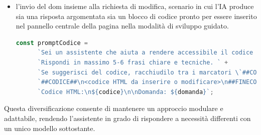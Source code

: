\begin{itemize}
    
    \item l’invio del \acrshort{dom} insieme alla richiesta di modifica, scenario in cui l’IA produce sia una risposta argomentata sia un blocco di codice pronto per essere inserito nel pannello centrale della pagina nella modalità di sviluppo guidato.
    \begin{lstlisting}[language=JavaScript, caption={Prompt per la generazione di risposta e codice \acrshort{html} accessibile}]
    const promptCodice =
      `Sei un assistente che aiuta a rendere accessibile il codice HTML. ` +
      `Rispondi in massimo 5-6 frasi chiare e tecniche. ` +
      `Se suggerisci del codice, racchiudilo tra i marcatori \`##CODICE##\` come mostrato di seguito:\n\n` +
      `##CODICE##\n<codice HTML da inserire o modificare>\n##FINECODICE##\n\n` +
      `Codice HTML:\n${codice}\n\nDomanda: ${domanda}`;
    \end{lstlisting}

\end{itemize}
Questa diversificazione consente di mantenere un approccio modulare e adattabile, rendendo l’assistente in grado di rispondere a necessità differenti con un unico modello sottostante.


